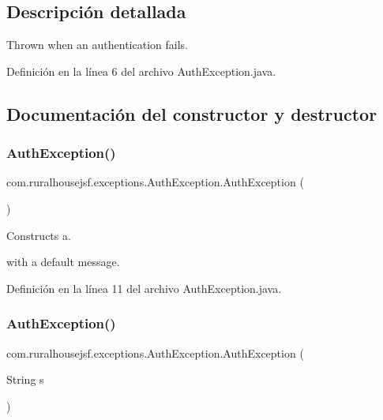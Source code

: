 \subsection{Descripción detallada}
Thrown when an authentication fails. 

Definición en la línea 6 del archivo Auth\+Exception.\+java.



\subsection{Documentación del constructor y destructor}
\mbox{\label{a00204_a092e5eb20bddab6f6741d8a04c7f05a2}} 
\subsubsection{\texorpdfstring{AuthException()}{AuthException()}\hspace{0.1cm}{\footnotesize\ttfamily [1/2]}}
{\footnotesize\ttfamily com.\+ruralhousejsf.\+exceptions.\+Auth\+Exception.\+Auth\+Exception (\begin{DoxyParamCaption}{ }\end{DoxyParamCaption})}



Constructs a. 


\begin{DoxyCode}{0}
\end{DoxyCode}
 with a default message. 

Definición en la línea 11 del archivo Auth\+Exception.\+java.

\mbox{\label{a00204_ac4b5a1b9673da9a2de397154017a0c1e}} 
\subsubsection{\texorpdfstring{AuthException()}{AuthException()}\hspace{0.1cm}{\footnotesize\ttfamily [2/2]}}
{\footnotesize\ttfamily com.\+ruralhousejsf.\+exceptions.\+Auth\+Exception.\+Auth\+Exception (\begin{DoxyParamCaption}\item[{String}]{s }\end{DoxyParamCaption})}



